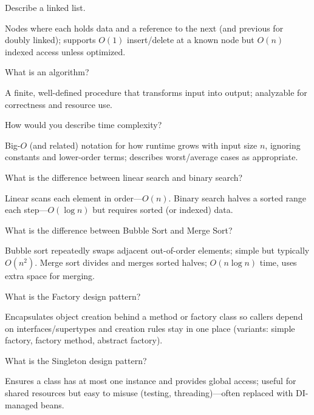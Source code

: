 \question[4]
Describe a linked list.
\makeemptybox{1.35in}
\begin{solution}
  Nodes where each holds data and a reference to the next (and previous for doubly linked); supports \(O(1)\) insert/delete at a known node but \(O(n)\) indexed access unless optimized.
\end{solution}

\question[4]
What is an algorithm?
\makeemptybox{1.05in}
\begin{solution}
  A finite, well-defined procedure that transforms input into output; analyzable for correctness and resource use.
\end{solution}

\question[4]
How would you describe time complexity?
\makeemptybox{1.35in}
\begin{solution}
  Big-\(O\) (and related) notation for how runtime grows with input size \(n\), ignoring constants and lower-order terms; describes worst/average cases as appropriate.
\end{solution}

\question[4]
What is the difference between linear search and binary search?
\makeemptybox{1.35in}
\begin{solution}
  Linear scans each element in order---\(O(n)\). Binary search halves a sorted range each step---\(O(\log n)\) but requires sorted (or indexed) data.
\end{solution}

\question[4]
What is the difference between Bubble Sort and Merge Sort?
\makeemptybox{1.45in}
\begin{solution}
  Bubble sort repeatedly swaps adjacent out-of-order elements; simple but typically \(O(n^2)\). Merge sort divides and merges sorted halves; \(O(n\log n)\) time, uses extra space for merging.
\end{solution}

\newpage


\question[4]
What is the Factory design pattern?
\makeemptybox{1.25in}
\begin{solution}
  Encapsulates object creation behind a method or factory class so callers depend on interfaces/supertypes and creation rules stay in one place (variants: simple factory, factory method, abstract factory).
\end{solution}

\question[4]
What is the Singleton design pattern?
\makeemptybox{1.25in}
\begin{solution}
  Ensures a class has at most one instance and provides global access; useful for shared resources but easy to misuse (testing, threading)---often replaced with DI-managed beans.
\end{solution}

